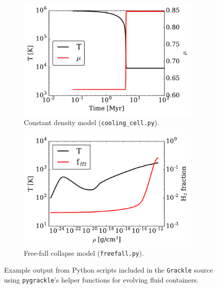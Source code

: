 \documentclass[11pt]{article}
\newcommand{\grackle}{\texttt{Grackle}}
\begin{document}
\begin{flushleft}
\begin{figure}
\centering
\begin{subfigure}{.48\textwidth}
  \centering
  \includegraphics[width=0.98\textwidth]{figures/cooling_cell.pdf}
  \caption{Constant density model (\texttt{cooling\_cell.py}).}
  \label{fig:cooling-cell}
\end{subfigure}%
\begin{subfigure}{.48\textwidth}
  \centering
  \includegraphics[width=0.98\textwidth]{figures/freefall.pdf}
  \caption{Free-fall collapse model (\texttt{freefall.py}).}
  \label{fig:freefall}
\end{subfigure}%
\caption{Example output from Python scripts included in the \grackle{}
  source using \texttt{pygrackle}'s helper functions for evolving
  fluid containers.}
\label{fig:evolve}
\vspace*{-1\baselineskip}
\end{figure}


\end{flushleft}
\end{document}
